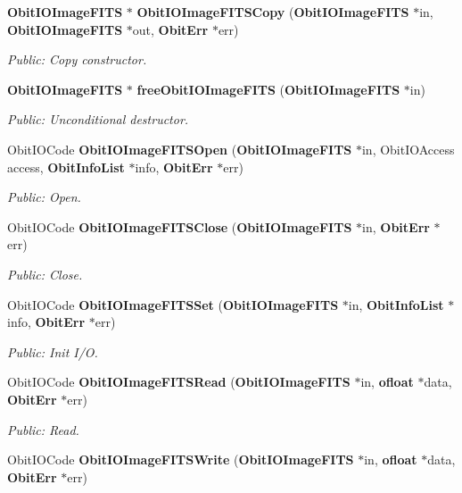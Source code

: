 \begin{CompactItemize}
{\bf Obit\-IOImage\-FITS} $\ast$ {\bf Obit\-IOImage\-FITSCopy} ({\bf Obit\-IOImage\-FITS} $\ast$in, {\bf Obit\-IOImage\-FITS} $\ast$out, {\bf Obit\-Err} $\ast$err)
\begin{CompactList}\small\item\em Public: Copy constructor. \item\end{CompactList}\item 
{\bf Obit\-IOImage\-FITS} $\ast$ {\bf free\-Obit\-IOImage\-FITS} ({\bf Obit\-IOImage\-FITS} $\ast$in)
\begin{CompactList}\small\item\em Public: Unconditional destructor. \item\end{CompactList}\item 
Obit\-IOCode {\bf Obit\-IOImage\-FITSOpen} ({\bf Obit\-IOImage\-FITS} $\ast$in, Obit\-IOAccess access, {\bf Obit\-Info\-List} $\ast$info, {\bf Obit\-Err} $\ast$err)
\begin{CompactList}\small\item\em Public: Open. \item\end{CompactList}\item 
Obit\-IOCode {\bf Obit\-IOImage\-FITSClose} ({\bf Obit\-IOImage\-FITS} $\ast$in, {\bf Obit\-Err} $\ast$err)
\begin{CompactList}\small\item\em Public: Close. \item\end{CompactList}\item 
Obit\-IOCode {\bf Obit\-IOImage\-FITSSet} ({\bf Obit\-IOImage\-FITS} $\ast$in, {\bf Obit\-Info\-List} $\ast$info, {\bf Obit\-Err} $\ast$err)
\begin{CompactList}\small\item\em Public: Init I/O. \item\end{CompactList}\item 
Obit\-IOCode {\bf Obit\-IOImage\-FITSRead} ({\bf Obit\-IOImage\-FITS} $\ast$in, {\bf ofloat} $\ast$data, {\bf Obit\-Err} $\ast$err)
\begin{CompactList}\small\item\em Public: Read. \item\end{CompactList}\item 
Obit\-IOCode {\bf Obit\-IOImage\-FITSWrite} ({\bf Obit\-IOImage\-FITS} $\ast$in, {\bf ofloat} $\ast$data, {\bf Obit\-Err} $\ast$err)

\end{CompactItemize}
